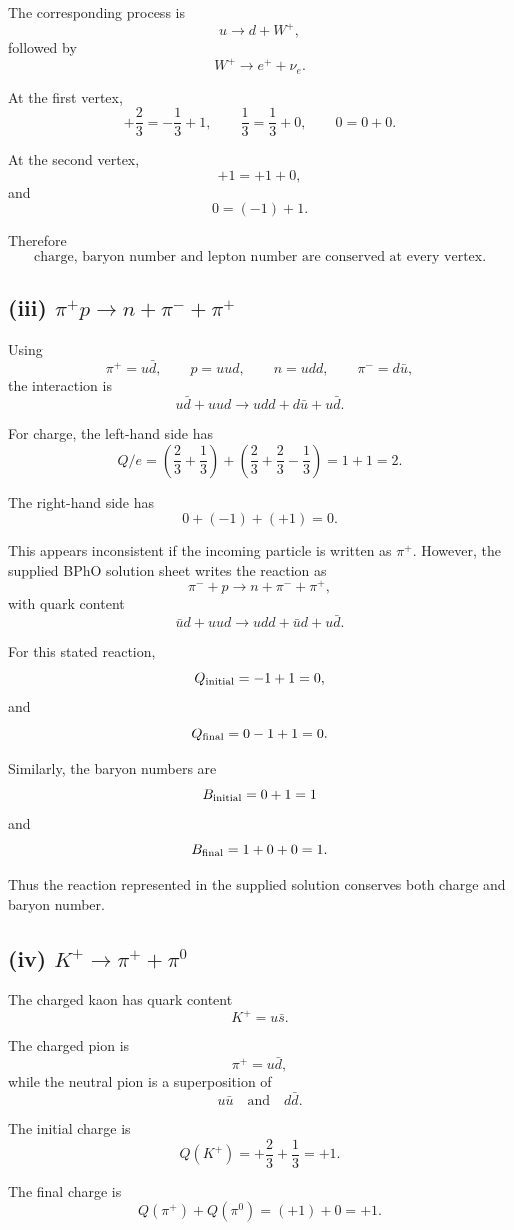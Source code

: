 \documentclass[11pt,a4paper]{article}
\begin{document}
The corresponding process is
\[
u\rightarrow d+W^+,
\]
followed by
\[
W^+\rightarrow e^++\nu_e.
\]

At the first vertex,
\[
+\frac23=-\frac13+1,
\qquad
\frac13=\frac13+0,
\qquad
0=0+0.
\]

At the second vertex,
\[
+1=+1+0,
\]
and
\[
0=(-1)+1.
\]

Therefore
\[
\boxed{\text{charge, baryon number and lepton number are conserved at every vertex.}}
\]

\subsection{(iii) $\pi^+p\rightarrow n+\pi^-+\pi^+$}

Using
\[
\pi^+=u\bar d,\qquad
p=uud,\qquad
n=udd,\qquad
\pi^-=d\bar u,
\]
the interaction is
\[
u\bar d+uud
\rightarrow
udd+d\bar u+u\bar d.
\]

For charge, the left-hand side has
\[
Q/e=
\left(\frac23+\frac13\right)
+
\left(\frac23+\frac23-\frac13\right)
=
1+1=2.
\]

The right-hand side has
\[
0+(-1)+(+1)=0.
\]

This appears inconsistent if the incoming particle is written as $\pi^+$.
However, the supplied BPhO solution sheet writes the reaction as
\[
\boxed{\pi^-+p\rightarrow n+\pi^-+\pi^+},
\]
with quark content
\[
\bar ud+uud
\rightarrow
udd+\bar ud+u\bar d.
\]

For this stated reaction,
\[
Q_{\rm initial}=-1+1=0,
\]
and
\[
Q_{\rm final}=0-1+1=0.
\]

Similarly, the baryon numbers are
\[
B_{\rm initial}=0+1=1
\]
and
\[
B_{\rm final}=1+0+0=1.
\]

Thus the reaction represented in the supplied solution conserves both charge and
baryon number.

\subsection{(iv) $K^+\rightarrow\pi^++\pi^0$}

The charged kaon has quark content
\[
K^+=u\bar s.
\]

The charged pion is
\[
\pi^+=u\bar d,
\]
while the neutral pion is a superposition of
\[
u\bar u
\quad\text{and}\quad
d\bar d.
\]

The initial charge is
\[
Q(K^+)=+\frac23+\frac13=+1.
\]

The final charge is
\[
Q(\pi^+)+Q(\pi^0)
=
(+1)+0
=+1.
\]
\end{document}
